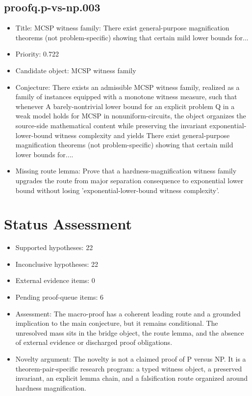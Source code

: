 \documentclass[11pt]{article}
\begin{document}
\subsection*{proofq.p-vs-np.003}
\begin{itemize}[leftmargin=*,itemsep=0.2em]
\item Title: MCSP witness family: There exist general-purpose magnification theorems (not problem-specific) showing that certain mild lower bounds for...
\item Priority: 0.722
\item Candidate object: MCSP witness family
\item Conjecture: There exists an admissible MCSP witness family, realized as a family of instances equipped with a monotone witness measure, such that whenever A barely-nontrivial lower bound for an explicit problem Q in a weak model holds for MCSP in nonuniform-circuits, the object organizes the source-side mathematical content while preserving the invariant exponential-lower-bound witness complexity and yields There exist general-purpose magnification theorems (not problem-specific) showing that certain mild lower bounds for....
\item Missing route lemma: Prove that a hardness-magnification witness family upgrades the route from major separation consequence to exponential lower bound without losing 'exponential-lower-bound witness complexity'.
\end{itemize}

\section{Status Assessment}
\begin{itemize}[leftmargin=*,itemsep=0.2em]
\item Supported hypotheses: 22
\item Inconclusive hypotheses: 22
\item External evidence items: 0
\item Pending proof-queue items: 6
\item Assessment: The macro-proof has a coherent leading route and a grounded implication to the main conjecture, but it remains conditional. The unresolved mass sits in the bridge object, the route lemma, and the absence of external evidence or discharged proof obligations.
\item Novelty argument: The novelty is not a claimed proof of P versus NP. It is a theorem-pair-specific research program: a typed witness object, a preserved invariant, an explicit lemma chain, and a falsification route organized around hardness magnification.
\end{itemize}
\end{document}
